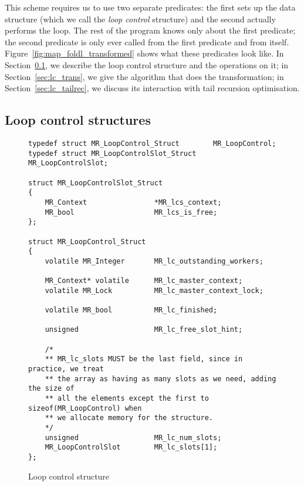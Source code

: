 This scheme requires us to use two separate predicates:
the first sets up the data structure
(which we call the \emph{loop control} structure)
and the second actually performs the loop.
The rest of the program knows only about the first predicate;
the second predicate is only ever called from the first predicate
and from itself.
Figure~\ref{fig:map_foldl_transformed} shows what these predicates look like.
In Section~\ref{sec:lc_structs},
we describe the loop control structure and the operations on it;
in Section~\ref{sec:lc_trans},
we give the algorithm that does the transformation;
in Section~\ref{sec:lc_tailrec},
we discuss its interaction with tail recursion optimisation.

\subsection{Loop control structures}
\label{sec:lc_structs}

\begin{figure}
\begin{verbatim}
typedef struct MR_LoopControl_Struct        MR_LoopControl;
typedef struct MR_LoopControlSlot_Struct    MR_LoopControlSlot;

struct MR_LoopControlSlot_Struct
{
    MR_Context                *MR_lcs_context;
    MR_bool                   MR_lcs_is_free;
};

struct MR_LoopControl_Struct
{
    volatile MR_Integer       MR_lc_outstanding_workers;

    MR_Context* volatile      MR_lc_master_context;
    volatile MR_Lock          MR_lc_master_context_lock;

    volatile MR_bool          MR_lc_finished;

    unsigned                  MR_lc_free_slot_hint;

    /*
    ** MR_lc_slots MUST be the last field, since in practice, we treat
    ** the array as having as many slots as we need, adding the size of
    ** all the elements except the first to sizeof(MR_LoopControl) when
    ** we allocate memory for the structure.
    */
    unsigned                  MR_lc_num_slots;
    MR_LoopControlSlot        MR_lc_slots[1];
};
\end{verbatim}
\caption{Loop control structure}
\label{fig:loop_control_structure}
\end{figure}

